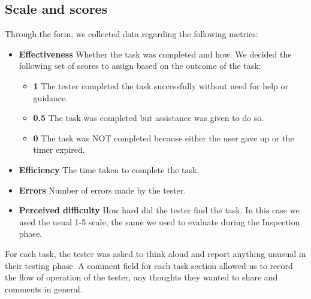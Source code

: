 \subsection{Scale and scores}
Through the form, we collected data regarding the following metrics:
\begin{itemize}
	\item \textbf{Effectiveness} Whether the task was completed and how. We decided the following set of scores to assign based on the outcome of the task:
		\begin{itemize}
			\item \textbf{1} The tester completed the task successfully without need for help or guidance.
			\item \textbf{0.5} The task was completed but assistance was given to do so.
			\item \textbf{0} The task was NOT completed because either the user gave up or the timer expired.
		\end{itemize}
	\item \textbf{Efficiency} The time taken to complete the task.
	\item \textbf{Errors} Number of errors made by the tester.
	\item \textbf{Perceived difficulty} How hard did the tester find the task. In this case we used the usual 1-5 scale, the same we used to evaluate during the Inspection phase.
\end{itemize}

For each task, the tester was asked to think aloud and report anything unusual in their testing phase. A comment field for each task section allowed us to record the flow of operation of the tester, any thoughts they wanted to share and comments in general.


